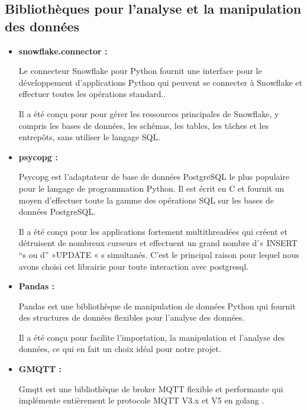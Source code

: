 \subsection{Bibliothèques pour l'analyse et la manipulation des données}
    \begin{itemize}
        \item\textbf{snowflake.connector : }
                 \par Le connecteur Snowflake pour Python fournit une interface pour le développement d'applications Python
                  qui peuvent se connecter à Snowflake et effectuer toutes les opérations standard.\cite{sncn}. 
                 \par Il a été conçu pour pour gérer les ressources principales de Snowflake, y compris les bases de données, les schémas, les tables, les tâches et les entrepôts, sans utiliser le langage SQL.
        \item\textbf{psycopg : }
                \par Psycopg est l'adaptateur de base de données PostgreSQL le plus populaire pour le langage de programmation Python. 
                Il est écrit en C et fournit un moyen d'effectuer toute la gamme des opérations SQL sur les bases de données PostgreSQL\cite{psycopg}. 
                \par Il a été conçu pour les applications fortement multithreadées qui créent et détruisent de nombreux curseurs et effectuent un grand nombre d'« INSERT “s ou d” »UPDATE « s simultanés. C'est le principal raison pour lequel nous avons choisi cet librairie pour toute interaction avec postgresql.
        \item\textbf{Pandas : }
                    \par  Pandas est une bibliothèque de manipulation de données Python qui fournit des structures de données flexibles pour l'analyse des données\cite{pandas}. 
                    \par Il a été conçu pour facilite l'importation, la manipulation et l'analyse des données, ce qui en fait un choix idéal pour notre projet.
        \item \textbf{GMQTT : }
            \par Gmqtt est une bibliothèque de broker MQTT flexible et performante qui implémente entièrement le protocole MQTT V3.x et V5 en golang \cite{gmqtt}. 
   \end{itemize}
